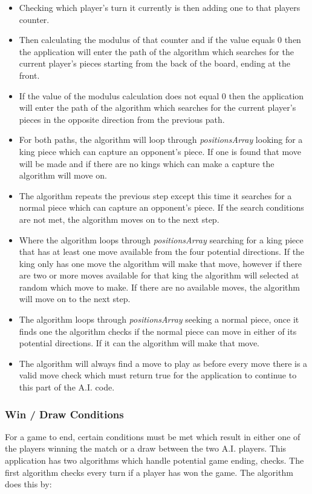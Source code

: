 \documentclass[10pt, a4paper]{article}
\begin{document}
    	
    	\begin{itemize}
    		\item Checking which player's turn it currently is then adding one to that players counter.    		
    		\item Then calculating the modulus of that counter and if the value equals 0 then the application will enter the path of the algorithm which searches for the current player's pieces starting from the back of the board, ending at the front. 
    		\item If the value of the modulus calculation does not equal 0 then the application will enter the path of the algorithm which searches for the current player's pieces in the opposite direction from the previous path.
    		\item For both paths, the algorithm will loop through \textit{positionsArray} looking for a king piece which can capture an opponent's piece. If one is found that move will be made and if there are no kings which can make a capture the algorithm will move on. 
    		\item The algorithm repeats the previous step except this time it searches for a normal piece which can capture an opponent's piece. If the search conditions are not met, the algorithm moves on to the next step.
    		\item Where the algorithm loops through \textit{positionsArray} searching for a king piece that has at least one move available from the four potential directions. If the king only has one move the algorithm will make that move, however if there are two or more moves available for that king the algorithm will selected at random which move to make. If there are no available moves, the algorithm will move on to the next step.
    		\item The algorithm loops through \textit{positionsArray} seeking a normal piece, once it finds one the algorithm checks if the normal piece can move in either of its potential directions. If it can the algorithm will make that move.
    		\item The algorithm will always find a move to play as before every move there is a valid move check which must return true for the application to continue to this part of the A.I. code.    		
    	\end{itemize}
    	
    	
    	
    	
    	
    	
    
    	\subsubsection{Win / Draw Conditions}
    	For a game to end, certain conditions must be met which result in either one of the players winning the match or a draw between the two A.I. players. This application has two algorithms which handle potential game ending, checks. The first algorithm checks every turn if a player has won the game.
    	\newline
    	The algorithm does this by:
    	
\end{document}
